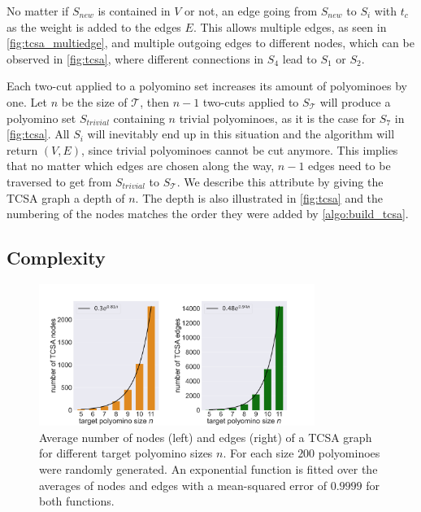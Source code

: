 No matter if $S_\textit{new}$ is contained in $V$ or not, an edge going from $S_\textit{new}$ to $S_i$ with $t_c$ as the weight is added to the edges $E$.
This allows multiple edges, as seen in \autoref{fig:tcsa_multiedge}, and multiple outgoing edges to different nodes, which can be observed in \autoref{fig:tcsa}, where different connections in $S_4$ lead to $S_1$ or $S_2$.

Each two-cut applied to a polyomino set increases its amount of polyominoes by one.
Let $n$ be the size of $\mathcal{T}$, then $n-1$ two-cuts applied to $S_\mathcal{T}$ will produce a polyomino set $S_\textit{trivial}$ containing $n$ trivial polyominoes, as it is the case for $S_7$ in \autoref{fig:tcsa}.
All $S_i$ will inevitably end up in this situation and the algorithm will return $(V,E)$, since trivial polyominoes cannot be cut anymore.
This implies that no matter which edges are chosen along the way, $n-1$ edges need to be traversed to get from $S_\textit{trivial}$ to $S_\mathcal{T}$.
We describe this attribute by giving the TCSA graph a depth of $n$.
The depth is also illustrated in \autoref{fig:tcsa} and the numbering of the nodes matches the order they were added by \autoref{algo:build_tcsa}.

\subsection{Complexity}

\begin{figure}
	\centering
	\includegraphics[width=0.8\textwidth]{figures/plots/tcsa_nodes_edges.pdf}
	\caption[Average two-cut-sub-assembly nodes and edges for target size $n$]{Average number of nodes (left) and edges (right) of a TCSA graph for different target polyomino sizes $n$. For each size $200$ polyominoes were randomly generated. An exponential function is fitted over the averages of nodes and edges with a mean-squared error of $0.9999$ for both functions.}
	\label{fig:tcsa_plot}
\end{figure}

